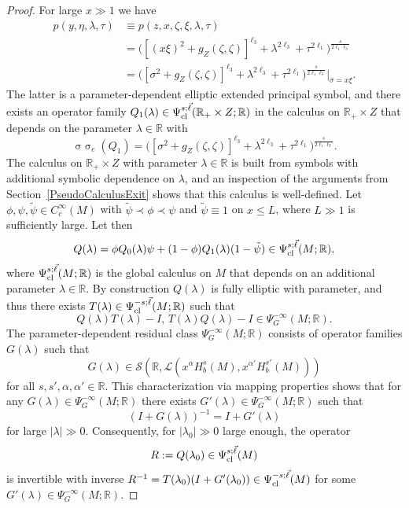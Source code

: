 \documentclass[reqno]{amsart}
\numberwithin{equation}{section}
\theoremstyle{definition}
\def\R{\mathbb R}
\def\L{\mathscr L}
\def\S{\mathscr S}
\DeclareMathOperator{\sym}{ \sigma\!\!\!\sigma}
\begin{document}
\begin{proof}
For large $x \gg 1$ we have
\begin{align*}
p(y,\eta,\lambda,\tau) &\equiv p(z,x,\zeta,\xi,\lambda,\tau) \\
&= \bigl([(x\xi)^2 + g_Z(\zeta,\zeta)]^{\ell_3} + \lambda^{2\ell_3} + \tau^{2\ell_1}\bigr)^{\frac{s}{2\ell_1\ell_3}} \\
&= \bigl([\sigma^2 + g_Z(\zeta,\zeta)]^{\ell_3} + \lambda^{2\ell_3} + \tau^{2\ell_1}\bigr)^{\frac{s}{2\ell_1\ell_3}}\Big|_{\sigma=x\xi}.
\end{align*}
The latter is a parameter-dependent elliptic extended principal symbol, and there exists an operator family $Q_1(\lambda) \in \Psi_{\textup{cl}}^{s;\vec{\ell}}(\R_+\times Z;\R)$ in the calculus on $\R_+\times Z$ that depends on the parameter $\lambda \in \R$ with
$$
\sym_e(Q_1) = \bigl([\sigma^2 + g_Z(\zeta,\zeta)]^{\ell_3} + \lambda^{2\ell_3} + \tau^{2\ell_1}\bigr)^{\frac{s}{2\ell_1\ell_3}}.
$$
The calculus on $\R_+\times Z$ with parameter $\lambda \in \R$ is built from symbols with additional symbolic dependence on $\lambda$, and an inspection of the arguments from Section~\ref{PseudoCalculusExit} shows that this calculus is well-defined. Let $\phi,\psi,\tilde{\psi} \in C_c^{\infty}(M)$ with $\tilde{\psi} \prec \phi \prec \psi$ and $\tilde{\psi} \equiv 1$ on $x \leq L$, where $L \gg 1$ is sufficiently large. Let then
$$
Q(\lambda) = \phi Q_0(\lambda)\psi + (1-\phi)Q_1(\lambda)(1-\tilde{\psi}) \in \Psi^{s;\vec{\ell}}_{\textup{cl}}(M;\R),
$$
where $\Psi^{s;\vec{\ell}}_{\textup{cl}}(M;\R)$ is the global calculus on $M$ that depends on an additional parameter $\lambda \in \R$. By construction $Q(\lambda)$ is fully elliptic with parameter, and thus there exists $T(\lambda) \in \Psi^{-s;\vec{\ell}}_{\textup{cl}}(M;\R)$ such that
$$
Q(\lambda)T(\lambda) - I,\,T(\lambda)Q(\lambda) - I \in \Psi^{-\infty}_G(M;\R).
$$
The parameter-dependent residual class $\Psi^{-\infty}_G(M;\R)$ consists of operator families $G(\lambda)$ such that
$$
G(\lambda) \in \S(\R,\L(x^{\alpha}H^s_b(M),x^{\alpha'}H^{s'}_b(M)))
$$
for all $s,s',\alpha,\alpha' \in \R$. This characterization via mapping properties shows that for any $G(\lambda) \in \Psi^{-\infty}_G(M;\R)$ there exists $G'(\lambda) \in \Psi^{-\infty}_G(M;\R)$ such that
$$
(I + G(\lambda))^{-1} = I + G'(\lambda)
$$
for large $|\lambda| \gg 0$. Consequently, for $|\lambda_0| \gg 0$ large enough, the operator
$$
R:= Q(\lambda_0) \in \Psi^{s;\vec{\ell}}_{\textup{cl}}(M)
$$
is invertible with inverse $R^{-1} = T(\lambda_0)(I + G'(\lambda_0)) \in \Psi^{-s;\vec{\ell}}_{\textup{cl}}(M)$ for some $G'(\lambda) \in \Psi^{-\infty}_G(M;\R)$.
\end{proof}
\end{document}
